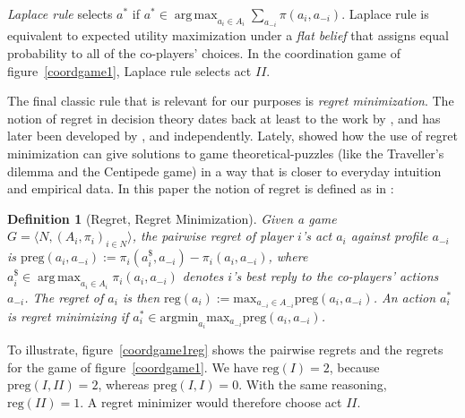 \documentclass[fleqn,reqno,12pt]{article}
\theoremstyle{Satz}
\newtheorem{definition}[theorem]{Definition}
\theoremstyle{Bsp}
\DeclareMathOperator*{\argmax}{arg\,max}
\newcommand{\Acts}{\ensuremath{A}\xspace}		%
\newcommand{\act}{\ensuremath{a}\xspace}		%
\begin{document}
\emph{Laplace rule} selects $\act^*$ if
$\act^* \in \argmax_{a_{i} \in \Acts_{i}} \sum_{a_{-i}} \pi(a_{i}, a_{-i})$.
Laplace rule is equivalent to expected utility maximization under a \emph{flat belief} that
assigns equal probability to all of the co-players' choices. In the coordination game of
figure~\ref{coordgame1}, Laplace rule selects act $II$.

The final classic rule that is relevant for our purposes is \emph{regret
  minimization}. The notion of regret in decision theory dates back at least to the work by
\citet{Savage1951:The-theory-of-s}, and has later been developed by \citet{bell82}, \citet{fish82} and \citet{loosug82} independently. Lately,
\citet{HalpernPass2012:Iterated-Regret} showed how the use of regret minimization can give
solutions to game theoretical-puzzles (like the Traveller's dilemma and the Centipede game) in a way that is closer to
everyday intuition and empirical data. In this paper the notion of regret is defined as in
\citet{HalpernPass2012:Iterated-Regret}:

\begin{definition}[Regret, Regret Minimization] \label{defn:regret} Given a game
  $ G=\langle N, (A_i , \pi_i)_{i \in N} \rangle $, the \emph{pairwise regret} of player $i$'s
  act $a_i$ against profile $a_{-i}$ is
  $\text{preg}(a_i,a_{-i}):= \pi_i(a_i^\$,a_{-i})-\pi_i(a_i,a_{-i}) $, where
  $a_i^\$ \in \argmax_{a_i \in A_i} \pi_i(a_i, a_{-i})$ denotes $i$'s best reply to the
  co-players' actions $a_{-i}$. The \emph{regret} of $a_i$ is then
  $\text{reg}(a_i):= \text{max}_{a_{-i}\in A_{-i}} \text{preg}(a_i,a_{-i}) $. An
  action $a^{*}_i $ is regret minimizing if
  $a^{*}_i \in \text{argmin}_{a_i} \text{max}_{a_{-i}} \text{preg}(a_i,a_{-i})$.
\end{definition}

\noindent To illustrate, figure~\ref{coordgame1reg} shows the pairwise regrets and the regrets for the game of figure~\ref{coordgame1}. 
We have
$\text{reg}(I)=2$, because $\text{preg}(I,II)=2$, whereas $ \text{preg}(I,I)=0 $. With the same reasoning, $\text{reg}(II)=1$. A regret minimizer would therefore choose act $II$.
\end{document}
